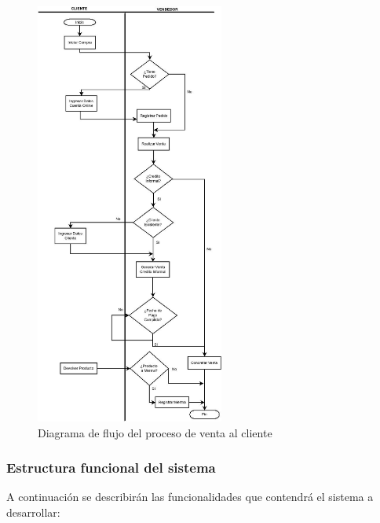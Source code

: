 \documentclass[letterpaper,12pt]{article}
\begin{document}
\mbox{}
\begin{figure}[!ht]
\begin{center}
\includegraphics[width =0.5509\textwidth]{images/flujoadm_cliente_vendedor.jpeg}
\end{center}
\caption{Diagrama de flujo del proceso de venta al cliente}
\end{figure}

\newpage

\subsubsection{Estructura funcional del sistema}

A continuación se describirán las funcionalidades que contendrá el sistema a desarrollar:
\end{document}
